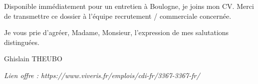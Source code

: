 \documentclass[11pt,a4paper]{article}
\begin{document}
\vspace{0.35em}
\noindent Disponible imm\'ediatement pour un entretien \`a Boulogne, je joins mon CV. Merci de transmettre ce dossier \`a l'\'equipe recrutement / commerciale concern\'ee.

\vspace{0.55em}
\noindent Je vous prie d'agr\'eer, Madame, Monsieur, l'expression de mes salutations distingu\'ees.

\vspace{1.1em}
\noindent Ghislain THEUBO

\vspace{0.4em}
\noindent\textit{\small Lien offre : https://www.viveris.fr/emplois/cdi-fr/3367-3367-fr/}
\end{document}
